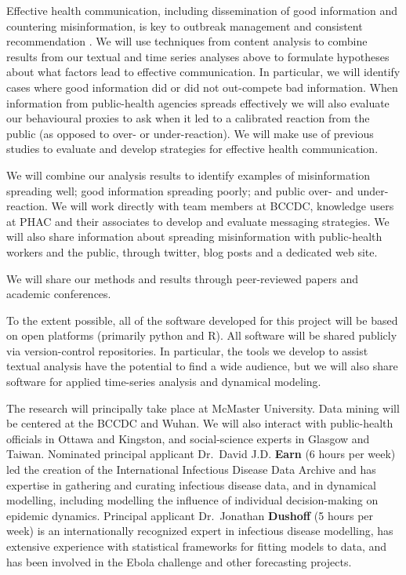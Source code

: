 
Effective health communication, including dissemination of good information and countering misinformation, is key to outbreak management \citep{SongSong17} and consistent recommendation \citep{OhlrSugg18,SongSong17}.
We will use techniques from content analysis \citep{Finf13 ,Mayr14} to combine results from our textual and time series analyses above to formulate hypotheses about what factors lead to effective communication. In particular, we will identify cases where good information did or did not out-compete bad information. When information from public-health agencies spreads effectively we will also evaluate our behavioural proxies to ask when it led to a calibrated reaction from the public (as opposed to over- or under-reaction).
We will make use of previous studies to evaluate \citep{Ding14,FarmSher18,NowaShee15,Tam18} and develop \citep{BekaBigm18, ShenShee15, SongSong17} strategies for effective health communication.


 We will combine our analysis results to identify examples of misinformation spreading well; good information spreading poorly; and public over- and under-reaction. We will work directly with team members at BCCDC, knowledge users at PHAC and their associates to develop and evaluate messaging strategies. We will also share information about spreading misinformation with public-health workers and the public, through twitter, blog posts and a dedicated web site. 

 We will share our methods and results through peer-reviewed papers and academic conferences. 

 To the extent possible, all of the software developed for this project will be based on open platforms (primarily python and R). All software will be shared publicly via version-control repositories. In particular, the tools we develop to assist textual analysis have the potential to find a wide audience, but we will also share software for applied time-series analysis and dynamical modeling.


The research will principally take place at McMaster University. Data mining will be centered at the BCCDC and Wuhan. We will also interact with public-health officials in Ottawa and Kingston, and social-science experts in Glasgow and Taiwan.
Nominated principal applicant Dr.\ David J.D. \textbf{Earn} (6 hours per week) led the creation of the International Infectious Disease Data Archive and has expertise in gathering and curating infectious disease data, and in dynamical modelling, including modelling the influence of individual decision-making on epidemic dynamics.
Principal applicant Dr.\ Jonathan \textbf{Dushoff} (5 hours per week) is an internationally recognized expert in infectious disease modelling, has extensive experience with statistical frameworks for fitting models to data, and has been involved in the Ebola challenge and other forecasting projects.

